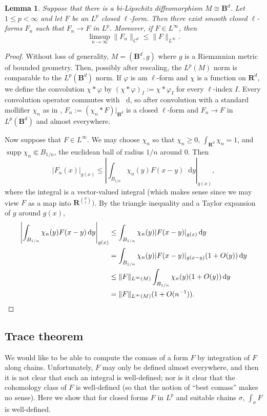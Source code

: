\documentclass[reqno,11pt]{amsart}
\newcommand{\RR}{\mathbf{R}}
\newcommand{\Ball}{\mathbf{B}}
\newcommand*\dif{\mathop{}\!\mathrm{d}}
\DeclareMathOperator{\supp}{supp}
\newtheorem{lemma}[theorem]{Lemma}
\theoremstyle{definition}
\numberwithin{equation}{section}
\begin{document}
\begin{lemma}\label{mollification of closed forms}
Suppose that there is a bi-Lipschitz diffeomorphism $M \cong \Ball^d$.
Let $1 \leq p < \infty$ and let $F$ be an $L^p$ closed $\ell$-form.
Then there exist smooth closed $\ell$-forms $F_n$ such that $F_n \to F$ in $L^p$.
Moreover, if $F \in L^\infty$, then
\begin{equation}\label{heat kernel contracts sup norm}
\limsup_{n \to \infty} \|F_n\|_{C^0} \leq \|F\|_{L^\infty}.
\end{equation}
\end{lemma}
\begin{proof}
Without loss of generality, $M = (\Ball^d, g)$ where $g$ is a Riemannian metric of bounded geometry.
Then, possibly after rescaling, the $L^p(M)$ norm is comparable to the $L^p(\Ball^d)$ norm.
If $\varphi$ is am $\ell$-form and $\chi$ is a function on $\RR^d$, we define the convolution $\chi * \varphi$ by $(\chi * \varphi)_I := \chi * \varphi_I$ for every $\ell$-index $I$.
Every convolution operator commutes with $\dif$, so after convolution with a standard mollifier $\chi_n$ as in \cite[Appendix C, Theorem 6]{evans2010partial}, $F_n := (\chi_n * F)|_{\Ball^d}$ is a closed $\ell$-form and $F_n \to F$ in $L^p(\Ball^d)$ and almost everywhere.

Now suppose that $F \in L^\infty$.
We may choose $\chi_n$ so that $\chi_n \geq 0$, $\int_{\RR^d} \chi_n = 1$, and $\supp \chi_n \Subset B_{1/n}$, the euclidean ball of radius $1/n$ around $0$.
Then 
$$|F_n(x)|_{g(x)} \leq \left|\int_{B_{1/n}} \chi_n(y) F(x - y) \dif y\right|_{g(x)},$$
where the integral is a vector-valued integral (which makes sense since we may view $F$ as a map into $\RR^{\binom d\ell})$.
By the triangle inequality and a Taylor expansion of $g$ around $g(x)$,
\begin{align*}
\left|\int_{B_{1/n}} \chi_n(y) F(x - y) \dif y\right|_{g(x)}
&\leq \int_{B_{1/n}} \chi_n(y) |F(x - y)|_{g(x)} \dif y \\
&= \int_{B_{1/n}} \chi_n(y) |F(x - y)|_{g(x - y)}(1 + O(y)) \dif y \\
&\leq \|F\|_{L^\infty(M)} \int_{B_{1/n}} \chi_n(y)(1 + O(y)) \dif y \\
&= \|F\|_{L^\infty(M)}(1 + O(n^{-1})). \qedhere 
\end{align*}
\end{proof}

\subsection{Trace theorem}
We would like to be able to compute the comass of a form $F$ by integration of $F$ along chains.
Unfortunately, $F$ may only be defined almost everywhere, and then it is not clear that such an integral is well-defined; nor is it clear that the cohomology class of $F$ is well-defined (so that the notion of ``best comass'' makes no sense).
Here we show that for closed forms $F$ in $L^p$ and suitable chains $\sigma$, $\int_\sigma F$ is well-defined.
\end{document}
